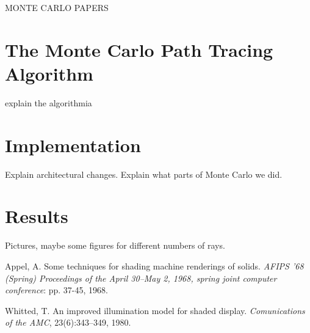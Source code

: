 \documentclass[journal]{IEEEtran}
\begin{document}
MONTE CARLO PAPERS

\section{The Monte Carlo Path Tracing Algorithm}
explain the algorithmia

\section{Implementation}
Explain architectural changes.
Explain what parts of Monte Carlo we did.

\section{Results}
Pictures, maybe some figures for different numbers of rays.



\begin{thebibliography}{2}

Appel, A. Some techniques for shading machine renderings of solids. \emph{AFIPS '68 (Spring) Proceedings of the April 30--May 2, 1968, spring joint computer conference}: pp. 37-45, 1968.

 Whitted, T. An improved illumination model for shaded display. \emph{Comunications of the AMC}, 23(6):343–349, 1980.

\end{thebibliography}

\end{document}

